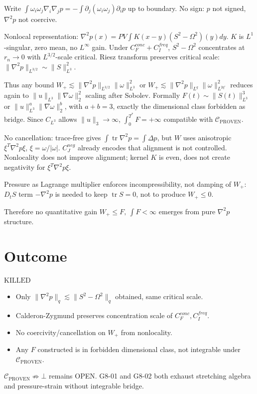 \documentclass[11pt]{article}
\begin{document}
Write $\int\omega_i\omega_j\nabla_i\nabla_jp=-\int\partial_j(\omega_i\omega_j)\partial_ip$ up to boundary.
No sign: $p$ not signed, $\nabla^2p$ not coercive.

Nonlocal representation: $\nabla^2p(x)=PV\int K(x-y)(S^2-\Omega^2)(y)dy$.
$K$ is $L^1$-singular, zero mean, no $L^\infty$ gain.
Under $C_F^{conc}+C_I^{freq}$, $S^2-\Omega^2$ concentrates at $r_n\to0$ with $L^{3/2}$-scale critical.
Riesz transform preserves critical scale: $\|\nabla^2p\|_{L^{3/2}}\sim\|S\|_{L^3}^2$.

Thus any bound $W_+\lesssim\|\nabla^2p\|_{L^{3/2}}\|\omega\|_{L^3}^2$ or $W_+\lesssim\|\nabla^2p\|_{L^q}\|\omega\|_{L^{2q'}}^2$ reduces again to $\|u\|_{L^3}\|\nabla\omega\|_2^2$ scaling after Sobolev.
Formally $F(t)\sim\|S(t)\|_{L^3}^3$ or $\|u\|_{L^3}^a\|\nabla\omega\|_2^b$, with $a+b=3$, exactly the dimensional class forbidden as bridge.
Since $C_{L^3}$ allows $\|u\|_3\to\infty$, $\int_0^{T^*}F=+\infty$ compatible with $\mathcal C_{\mathrm{PROVEN}}$.

No cancellation: trace-free gives $\int\operatorname{tr}\nabla^2p=\int\Delta p$, but $W$ uses anisotropic $\xi^T\nabla^2p\xi$, $\xi=\omega/|\omega|$. $C_J^{neg}$ already encodes that alignment is not controlled. Nonlocality does not improve alignment; kernel $K$ is even, does not create negativity for $\xi^T\nabla^2p\xi$.

Pressure as Lagrange multiplier enforces incompressibility, not damping of $W_+$: $D_tS$ term $-\nabla^2p$ is needed to keep $\operatorname{tr}S=0$, not to produce $W_+\le0$.

Therefore no quantitative gain $\boxed{W_+\le F,\ \int F<\infty}$ emerges from pure $\nabla^2p$ structure.

\section{Outcome}
$\boxed{\mathrm{KILLED}}$
\begin{itemize}
\item Only $\|\nabla^2p\|_q\lesssim\|S^2-\Omega^2\|_q$ obtained, same critical scale.
\item Calderon-Zygmund preserves concentration scale of $C_F^{conc},C_I^{freq}$.
\item No coercivity/cancellation on $W_+$ from nonlocality.
\item Any $F$ constructed is in forbidden dimensional class, not integrable under $\mathcal C_{\mathrm{PROVEN}}$.
\end{itemize}
$\mathcal C_{\mathrm{PROVEN}}\not\Rightarrow\bot$ remains OPEN. G8-01 and G8-02 both exhaust stretching algebra and pressure-strain without integrable bridge.
\end{document}
